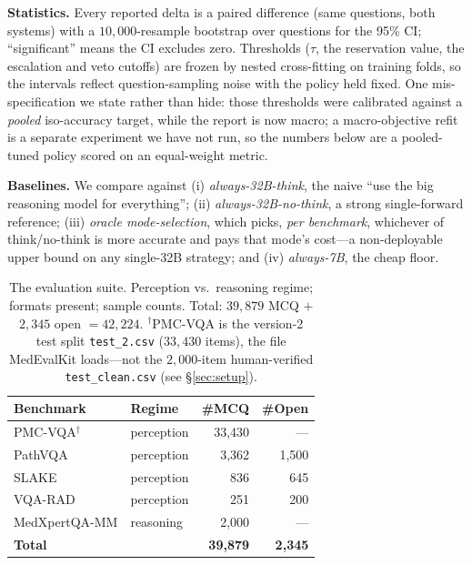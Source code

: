 \documentclass[conference]{IEEEtran}
\begin{document}
\textbf{Statistics.} Every reported delta is a paired difference (same questions, both systems) with a $10{,}000$-resample bootstrap over questions for the 95\% CI; ``significant'' means the CI excludes zero. Thresholds ($\tau$, the reservation value, the escalation and veto cutoffs) are frozen by nested cross-fitting on training folds, so the intervals reflect question-sampling noise with the policy held fixed. One mis-specification we state rather than hide: those thresholds were calibrated against a \emph{pooled} iso-accuracy target, while the report is now macro; a macro-objective refit is a separate experiment we have not run, so the numbers below are a pooled-tuned policy scored on an equal-weight metric.

\textbf{Baselines.} We compare against (i) \emph{always-32B-think}, the naive ``use the big reasoning model for everything''; (ii) \emph{always-32B-no-think}, a strong single-forward reference; (iii) \emph{oracle mode-selection}, which picks, \emph{per benchmark}, whichever of think/no-think is more accurate and pays that mode's cost---a non-deployable upper bound on any single-32B strategy; and (iv) \emph{always-7B}, the cheap floor.

\begin{table}[t]
\centering
\caption{The evaluation suite. Perception vs.\ reasoning regime; formats present; sample counts. Total: $39{,}879$ MCQ $+$ $2{,}345$ open $= 42{,}224$. $^{\dagger}$PMC-VQA is the version-2 test split \texttt{test\_2.csv} ($33{,}430$ items), the file MedEvalKit loads---not the $2{,}000$-item human-verified \texttt{test\_clean.csv} (see \S\ref{sec:setup}).}
\label{tab:bench}
\footnotesize
\begin{tabular}{@{}llrr@{}}
\toprule
Benchmark & Regime & \#MCQ & \#Open \\
\midrule
PMC-VQA$^{\dagger}$ & perception & 33{,}430 & --- \\
PathVQA           & perception & 3{,}362 & 1{,}500 \\
SLAKE             & perception & 836 & 645 \\
VQA-RAD           & perception & 251 & 200 \\
MedXpertQA-MM     & reasoning  & 2{,}000 & --- \\
\midrule
\textbf{Total}    &            & \textbf{39{,}879} & \textbf{2{,}345} \\
\bottomrule
\end{tabular}
\end{table}
\end{document}
